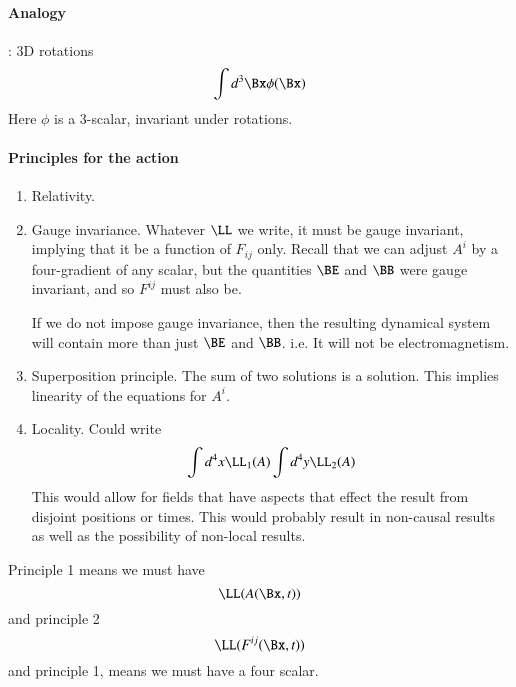 \paragraph{Analogy}: 3D rotations
%
\begin{equation}\label{eqn:relativisticElectrodynamicsL12b:190}
\int d^3 \Bx \phi(\Bx)
\end{equation}
%
Here \(\phi\) is a 3-scalar, invariant under rotations.
%
\paragraph{Principles for the action}

\begin{enumerate}
\item Relativity.
\item Gauge invariance.  Whatever \(\LL\) we write, it must be gauge invariant, implying that it be a function of \(F_{ij}\) only.  Recall that we can adjust \(A^i\) by a four-gradient of any scalar, but the quantities \(\BE\) and \(\BB\) were gauge invariant, and so \(F^{ij}\) must also be.

If we do not impose gauge invariance, then the resulting dynamical system will contain more than just \(\BE\) and \(\BB\).  i.e. It will not be electromagnetism.

\item Superposition principle.  The sum of two solutions is a solution.  This implies linearity of the equations for \(A^i\).

\item Locality.  Could write
%
\begin{equation}\label{eqn:relativisticElectrodynamicsL12b:210}
\int d^4 x \LL_1(A) \int d^4 y \LL_2(A)
\end{equation}
%
This would allow for fields that have aspects that effect the result from disjoint positions or times.  This would probably result in non-causal results as well as the possibility of non-local results.
\end{enumerate}

Principle 1 means we must have
%
\begin{equation}\label{eqn:relativisticElectrodynamicsL12b:230}
\LL(A(\Bx, t))
\end{equation}
%
and principle 2
%
\begin{equation}\label{eqn:relativisticElectrodynamicsL12b:250}
\LL(F^{ij}(\Bx, t))
\end{equation}
%
and principle 1, means we must have a four scalar.

